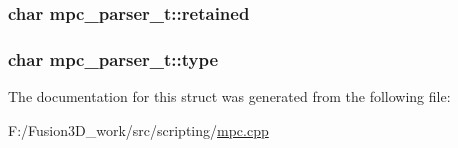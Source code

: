 \subsubsection[{retained}]{\setlength{\rightskip}{0pt plus 5cm}char mpc\+\_\+parser\+\_\+t\+::retained}\label{structmpc__parser__t_ac4673f0e9bd1a7f26afca3a08c1e3a59}
\hypertarget{structmpc__parser__t_ae8dc350baf8b9393420108c7fd1f3835}{}
\subsubsection[{type}]{\setlength{\rightskip}{0pt plus 5cm}char mpc\+\_\+parser\+\_\+t\+::type}\label{structmpc__parser__t_ae8dc350baf8b9393420108c7fd1f3835}


The documentation for this struct was generated from the following file\+:\begin{DoxyCompactItemize}
\item 
F\+:/\+Fusion3\+D\+\_\+work/src/scripting/\hyperlink{mpc_8cpp}{mpc.\+cpp}\end{DoxyCompactItemize}
